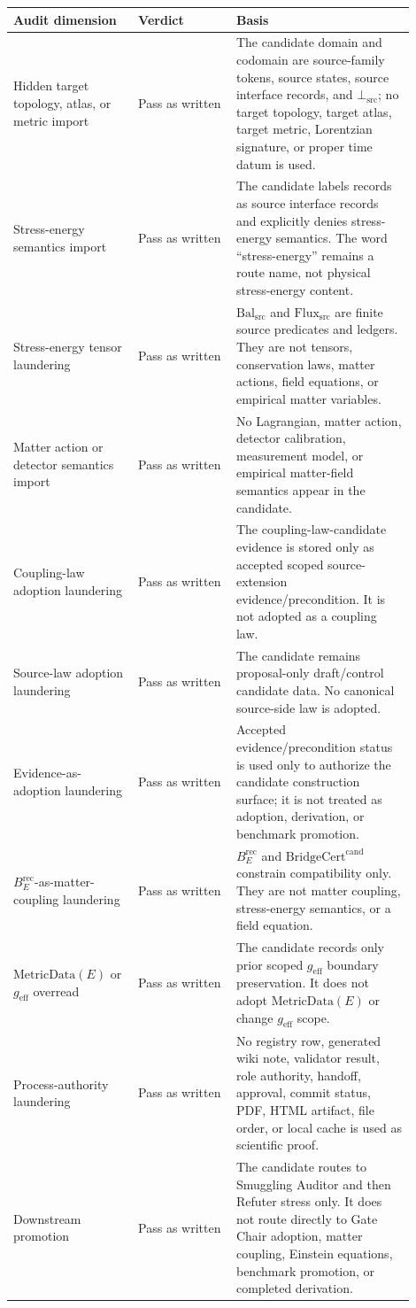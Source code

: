 \documentclass[11pt]{article}
\newcommand{\MetricData}{\mathrm{MetricData}}
\newcommand{\geff}{g_{\mathrm{eff}}}
\newcommand{\BErec}{B_E^{\mathrm{rec}}}
\newcommand{\BridgeCertCand}{\mathrm{BridgeCert}^{\mathrm{cand}}}
\newcommand{\BalSrc}{\mathrm{Bal}_{\mathrm{src}}}
\newcommand{\FluxSrc}{\mathrm{Flux}_{\mathrm{src}}}
\newcommand{\BottomSrc}{\bot_{\mathrm{src}}}
\begin{document}
\begin{longtable}{p{0.28\linewidth}p{0.22\linewidth}p{0.40\linewidth}}
\toprule
Audit dimension & Verdict & Basis \\
\midrule
Hidden target topology, atlas, or metric import &
Pass as written &
The candidate domain and codomain are source-family tokens, source states,
source interface records, and \(\BottomSrc\); no target topology, target
atlas, target metric, Lorentzian signature, or proper time datum is used. \\
\addlinespace
Stress-energy semantics import &
Pass as written &
The candidate labels records as source interface records and explicitly
denies stress-energy semantics. The word ``stress-energy'' remains a route
name, not physical stress-energy content. \\
\addlinespace
Stress-energy tensor laundering &
Pass as written &
\(\BalSrc\) and \(\FluxSrc\) are finite source predicates and ledgers. They
are not tensors, conservation laws, matter actions, field equations, or
empirical matter variables. \\
\addlinespace
Matter action or detector semantics import &
Pass as written &
No Lagrangian, matter action, detector calibration, measurement model, or
empirical matter-field semantics appear in the candidate. \\
\addlinespace
Coupling-law adoption laundering &
Pass as written &
The coupling-law-candidate evidence is stored only as accepted scoped
source-extension evidence/precondition. It is not adopted as a coupling law. \\
\addlinespace
Source-law adoption laundering &
Pass as written &
The candidate remains proposal-only draft/control candidate data. No
canonical source-side law is adopted. \\
\addlinespace
Evidence-as-adoption laundering &
Pass as written &
Accepted evidence/precondition status is used only to authorize the candidate
construction surface; it is not treated as adoption, derivation, or benchmark
promotion. \\
\addlinespace
\(\BErec\)-as-matter-coupling laundering &
Pass as written &
\(\BErec\) and \(\BridgeCertCand\) constrain compatibility only. They are not
matter coupling, stress-energy semantics, or a field equation. \\
\addlinespace
\(\MetricData(E)\) or \(\geff\) overread &
Pass as written &
The candidate records only prior scoped \(\geff\) boundary preservation. It
does not adopt \(\MetricData(E)\) or change \(\geff\) scope. \\
\addlinespace
Process-authority laundering &
Pass as written &
No registry row, generated wiki note, validator result, role authority,
handoff, approval, commit status, PDF, HTML artifact, file order, or local
cache is used as scientific proof. \\
\addlinespace
Downstream promotion &
Pass as written &
The candidate routes to Smuggling Auditor and then Refuter stress only. It
does not route directly to Gate Chair adoption, matter coupling, Einstein
equations, benchmark promotion, or completed derivation. \\
\bottomrule
\end{longtable}
\end{document}
